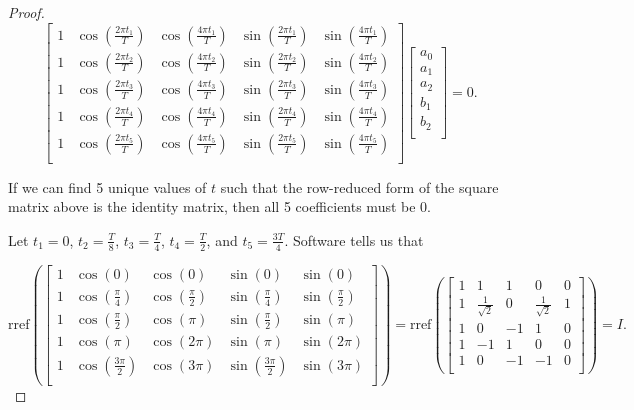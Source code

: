 \begin{theorem}
\begin{proof}
        \[
        \begin{bmatrix}
            1 & \cos(\frac{2\pi t_1}{T}) & \cos(\frac{4\pi t_1}{T}) & \sin(\frac{2\pi t_1}{T}) & \sin(\frac{4\pi t_1}{T})\\
            1 & \cos(\frac{2\pi t_2}{T}) & \cos(\frac{4\pi t_2}{T}) & \sin(\frac{2\pi t_2}{T}) & \sin(\frac{4\pi t_2}{T})\\
            1 & \cos(\frac{2\pi t_3}{T}) & \cos(\frac{4\pi t_3}{T}) & \sin(\frac{2\pi t_3}{T}) & \sin(\frac{4\pi t_3}{T})\\
            1 & \cos(\frac{2\pi t_4}{T}) & \cos(\frac{4\pi t_4}{T}) & \sin(\frac{2\pi t_4}{T}) & \sin(\frac{4\pi t_4}{T})\\
            1 & \cos(\frac{2\pi t_5}{T}) & \cos(\frac{4\pi t_5}{T}) & \sin(\frac{2\pi t_5}{T}) & \sin(\frac{4\pi t_5}{T})\\
        \end{bmatrix} \begin{bmatrix}
            a_0\\
            a_1\\
            a_2\\
            b_1\\
            b_2\\
        \end{bmatrix} = 0.
        \]
        
        
        \par \bigskip If we can find 5 unique values of $t$ such that the row-reduced form of the square matrix above is the identity matrix, then all 5 coefficients must be 0.
        
        \par \bigskip Let $t_1 = 0$, $t_2 = \frac{T}{8}$, $t_3 = \frac{T}{4}$, $t_4 = \frac{T}{2}$, and $t_5 = \frac{3T}{4}$. Software tells us that
        
        \[
        \text{rref}\left(\begin{bmatrix}
            1 & \cos(0) & \cos(0) & \sin(0) & \sin(0)\\
            1 & \cos(\frac{\pi}{4}) & \cos(\frac{\pi}{2}) & \sin(\frac{\pi}{4}) & \sin(\frac{\pi}{2})\\
            1 & \cos(\frac{\pi}{2}) & \cos(\pi) & \sin(\frac{\pi}{2}) & \sin(\pi)\\
            1 & \cos(\pi) & \cos(2\pi) & \sin(\pi) & \sin(2\pi)\\
            1 & \cos(\frac{3\pi}{2}) & \cos(3\pi) & \sin(\frac{3\pi}{2}) & \sin(3\pi)\\
        \end{bmatrix}\right) = \text{rref}\left(\begin{bmatrix}
            1 & 1 & 1 & 0 & 0\\
            1 & \frac{1}{\sqrt{2}} & 0 & \frac{1}{\sqrt{2}} & 1\\
            1 & 0 & -1 & 1 & 0\\
            1 & -1 & 1 & 0 & 0\\
            1 & 0 & -1 & -1 & 0\\
        \end{bmatrix}\right) = I.
        \]
        

\end{proof}
\end{theorem}
